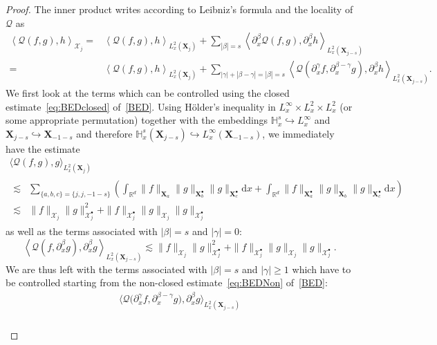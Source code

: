 \documentclass[AHL,Unicode,longabstracts,published]{cedram}
\renewcommand{\d}{\mathrm{d}}
\newcommand{\R}{\mathbb{R}}
\newcommand{\bbH}{\mathbb{H}}
\newcommand{\XX}{\mathcal{X}}
\newcommand{\QQ}{\mathcal{Q}}
\newcommand{\Sh}{\bm{X}}
\newcommand{\Shp}{\bm{X}^{\bullet}}
\newcommand{\SSh}{\bm{\XX}}
\newcommand{\SShp}{\bm{\XX}^{\bullet}}
\renewcommand*\ge{\geqslant}
\newcommand{\la}{\langle}
\newcommand{\ra}{\rangle}
\begin{document}
\begin{proof}
The inner product writes according to Leibniz's formula and the locality of $\QQ$ as
\begin{align*}
\left\la \QQ(f, g), h \right\ra_{ \SSh_j } = & \left\la \QQ(f, g), h \right\ra_{ L^2_x \left(\Sh_{j} \right) } + \sum_{| \beta | = s } \left\la \partial_x^\beta \QQ(f, g), \partial_x^\beta h \right\ra_{ L^2_x \left(\Sh_{j-s} \right) } \\ = & \left\la \QQ(f, g), h \right\ra_{ L^2_x \left(\Sh_{j} \right) } + {\sum_{|\gamma|+|\beta-\gamma|=|\beta|=s}} \left\la \QQ\left(\partial_x^\gamma f, \partial_x^{\beta-\gamma} g \right), \partial_x^{\beta} h \right\ra_{ L^2_x \left(\Sh_{j-s} \right) }.
\end{align*}
We first look at the terms which can be controlled using the closed estimate~\eqref{eq:BEDclosed} of~\eqref{BED}. Using H\"older's inequality in $L^\infty_x \times L^2_x \times L^2_x$ (or some appropriate permutation) together with the embeddings $\bbH^s_x \hookrightarrow L^\infty_x$ and $\Sh_{j-s} \hookrightarrow \Sh_{-1-s}$ and therefore $\bbH^s_x (\Sh_{j-s}) \hookrightarrow L^\infty_x (\Sh_{-1-s})$, we immediately have the estimate
\begin{multline*}
\la \QQ(f, g), g \ra_{ L^2_x \left(\Sh_{j} \right) }
\\
\begin{aligned}
\lesssim & \sum_{ \{ a, b, c \} = \{j, j, -1-s \} } \left(\int_{\R^d} \| f \|_{\Sh_{ a }} \| g \|_{\Shp_{b}} \| g \|_{\Shp_{c}} \d x + \int_{\R^{d}}\| f \|_{\Shp_{a}} \| g \|_{\Sh_{b}} \| g \|_{\Shp_{c}} \d x \right)\\
\lesssim & \| f \|_{ \SSh_j } \| g \|_{ \SShp_j }^2 + \| f \|_{ \SShp_j } \| g \|_{ \SSh_j } \| g \|_{ \SShp_j }
\end{aligned}
\end{multline*}
as well as the terms associated with $| \beta | = s$ and $|\gamma| = 0$:
\[
\left\la \QQ\left(f, \partial_x^\beta g\right), \partial_x^\beta g \right\ra_{ L^2_x \left(\Sh_{j-s} \right) } \lesssim \| f \|_{ \SSh_j } \| g \|_{ \SShp_j }^2 + \| f \|_{ \SShp_j } \| g \|_{ \SSh_j } \| g \|_{ \SShp_j }.
\]
We are thus left with the terms associated with $|\beta|=s$ and $|\gamma| \ge 1$ which have to be controlled starting from the non-closed estimate~\eqref{eq:BEDNon} of~\ref{BED}:
\begin{multline}\label{eq:QQgammabeta}
\Big\la \QQ\big(\partial_x^\gamma f,  \partial_x^{\beta-\gamma} g\big), \partial_x^\beta g \Big\ra_{ L^2_x \left(\Sh_{j-s} \right) } \\
\begin{aligned}

\end{aligned}
\end{multline}
\end{proof}
\end{document}
